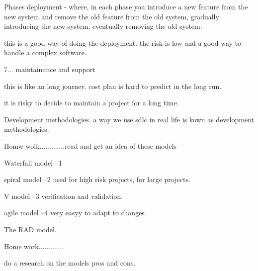 \documentclass[a4paper]{article}
\begin{document}
Phases deployment - where, in each phase you introduce a new feature from the new system and remove the old feature from the old system, gradually
introducing the new system, eventually removing the old system.

this is a good way of doing the deployment.
the risk is low 
and a good way to handle a complex software.

7...
maintainance and support    

this is like an long journey.
cost plan is hard to predict in the long run.

it is risky to decide to maintain a project for a long time.

Development methodologies.
a way we use sdlc in real life is kown as development methodologies.
  


Homw woik.............read and get an idea of these models 

Waterfall model    --1 

spiral model --2 used for high risk projects, for large projects.

V model --3 verification and validation. 

agile model --4 very easyy to adapt to changes.

The RAD model.

Home work.............



do a research on the models pros and cons. 
\end{document}
